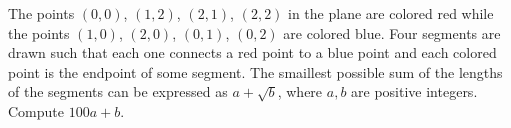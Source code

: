 The points $(0, 0)$, $(1, 2)$, $(2, 1)$, $(2, 2)$ in the plane are colored red while the points $(1, 0)$, $(2, 0)$, $(0, 1)$, $(0, 2)$ are colored blue. Four segments are drawn such that each one connects a red point to a blue point and each colored point is the endpoint of some segment. The smaillest possible sum of the lengths of the segments can be expressed as $a + \sqrt{b}$, where $a, b$ are positive integers. Compute $100a + b$.
